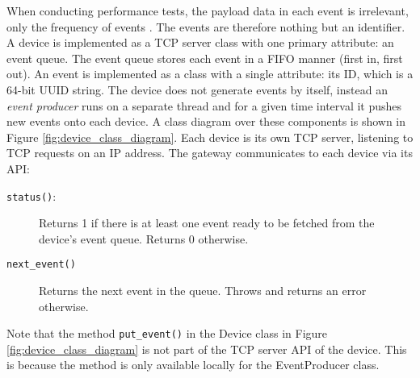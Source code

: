 When conducting performance tests, the payload data in each event is
irrelevant, only the frequency of events \cite{weyuker2000experience}. The
events are therefore nothing but an identifier. A device is implemented as a
TCP server class with one primary attribute: an event queue. The event queue
stores each event in a FIFO manner (first in, first out). An event is
implemented as a class with a single attribute: its ID, which is a 64-bit UUID
string. The device does not generate events by itself, instead an \textit{event
producer} runs on a separate thread and for a given time interval it pushes new
events onto each device. A class diagram over these components is shown in
Figure \ref{fig:device_class_diagram}. Each device is its own TCP server,
listening to TCP requests on an IP address. The gateway communicates to each
device via its API:

\begin{description}

    \item[\texttt{status()}:] Returns 1 if there is at least one event ready to
        be fetched from the device's event queue. Returns 0 otherwise.

    \item[\texttt{next\_event()}] Returns the next event in the queue. Throws
        and returns an error otherwise.

\end{description}

Note that the method \texttt{put\_event()} in the Device class in Figure
\ref{fig:device_class_diagram} is not part of the TCP server API of the device.
This is because the method is only available locally for the EventProducer class.

